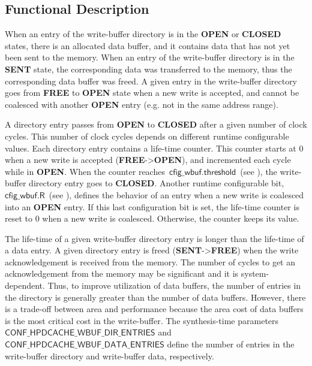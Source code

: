 \documentclass[10pt,titlepage,twoside]{book}
\begin{document}

\subsection{Functional Description}

When an entry of the write-buffer directory is in the \textbf{OPEN} or \textbf{CLOSED} states, there is an allocated data buffer, and it contains data that has not yet been sent to the memory.
When an entry of the write-buffer directory is in the \textbf{SENT} state, the corresponding data was transferred to the memory, thus the corresponding data buffer was freed.
A given entry in the write-buffer directory goes from \textbf{FREE} to \textbf{OPEN} state when a new write is accepted, and cannot be coalesced with another \textbf{OPEN} entry (e.g. not in the same address range).

A directory entry passes from \textbf{OPEN} to \textbf{CLOSED} after a given number of clock cycles.
This number of clock cycles depends on different runtime configurable values.
Each directory entry contains a life-time counter.
This counter starts at 0 when a new write is accepted (\textbf{FREE}->\textbf{OPEN}), and incremented each cycle while in \textbf{OPEN}.
When the counter reaches~$\mathsf{cfig\_wbuf.threshold}$~(see ), the write-buffer directory entry goes to \textbf{CLOSED}.
Another runtime configurable bit, $\mathsf{cfig\_wbuf.R}$~(see ), defines the behavior of an entry when a new write is coalesced into an \textbf{OPEN} entry.
If this last configuration bit is set, the life-time counter is reset to 0 when a new write is coalesced.
Otherwise, the counter keeps its value.

The life-time of a given write-buffer directory entry is longer than the life-time of a data entry.
A given directory entry is freed (\textbf{SENT}->\textbf{FREE}) when the write acknowledgement is received from the memory.
The number of cycles to get an acknowledgement from the memory may be significant and it is system-dependent.
Thus, to improve utilization of data buffers, the number of entries in the directory is generally greater than the number of data buffers.
However, there is a trade-off between area and performance because the area cost of data buffers is the most critical cost in the write-buffer.
The synthesis-time parameters $\mathsf{CONF\_HPDCACHE\_WBUF\_DIR\_ENTRIES}$ and $\mathsf{CONF\_HPDCACHE\_WBUF\_DATA\_ENTRIES}$ define the number of entries in the write-buffer directory and write-buffer data, respectively.
\end{document}
